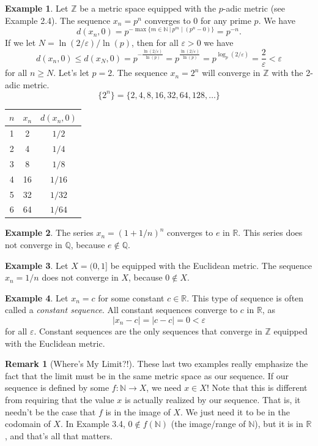 \documentclass{article}
\newcommand{\N}{\mathbb{N}}
\newcommand{\R}{\mathbb{R}}
\newcommand{\Q}{\mathbb{Q}}
\newcommand{\Z}{\mathbb{Z}}
\theoremstyle{definition}
\newtheorem{example}{Example}[section]
\newtheorem{remark}{Remark}[section]
\begin{document}
	\begin{example}
		Let $ \Z $ be a metric space equipped with the $ p $-adic metric (see Example 2.4). The sequence $ x_n=p^n $ converges to $ 0 $ for any prime $ p $. We have $$d(x_n,0)=p^{-\max\{ m\in\N\ |\ p^m\mid (p^n-0) \}}=p^{-n} .$$ If we let $ N=\ln(2/\varepsilon)/\ln(p) $, then for all $ \varepsilon>0 $ we have $$ d(x_n,0)\le d(x_N,0)=p^{-\frac{\ln(2/\varepsilon)}{\ln(p)}}=p^{\frac{\ln(2/\varepsilon)}{\ln(p)}}=p^{\log_p(2/\varepsilon)}=\frac{2}{\varepsilon}<\varepsilon$$ for all $ n\ge N $. Let's let $ p=2 $. The sequence $ x_n=2^n $ will converge in $ \Z $ with the 2-adic metric. $$ \{2^n\}=\{2,4,8,16,32,64,128,\ldots\}$$  
		\begin{center}
			\begin{tabular}{ccc}
				$ n $ & $ x_n $ & $ d(x_n,0) $ \\ \hline
				1 & 2     &  $ 1/2 $         \\
				2&   4   &   $ 1/4 $        \\
				3&    8  &   $ 1/8 $        \\
				4&     16 &   $ 1/16 $        \\
				5&      32&  $ 1/32 $          \\
				6&      64&       $ 1/64 $   
			\end{tabular}
		\end{center}
		
	\end{example}
	\begin{example}
		The series $ x_n=(1+1/n)^n $ converges to $ e $ in $ \R $. This series does not converge in $ \Q $, because $ e\notin\Q $. 
	\end{example}
	\begin{example}
		Let $ X=(0,1] $ be equipped with the Euclidean metric. The sequence $ x_n=1/n $ does not converge in $ X $, because $ 0\notin X $. 
	\end{example}
	\begin{example}
		Let $ x_n=c $ for some constant $ c\in\R $. This type of sequence is often called a \textit{\color{red}constant sequence}. All constant sequences converge to $ c $ in $ \R $, as $$ |x_n-c|=|c-c|=0<\varepsilon $$ for all $ \varepsilon $. Constant sequences are the only sequences that converge in $ \Z $ equipped with the Euclidean metric.
	\end{example}
	\begin{remark}[Where's My Limit?!]
		These last two examples really emphasize the fact that the limit must be in the same metric space as our sequence. If our sequence is defined by some $ f:\N\to X $, we need $ x\in X $! Note that this is different from requiring that the value $ x $ is actually realized by our sequence. That is, it needn't be the case that $ f $ is in the image of $ X $. We just need it to be in the codomain of $ X $. In Example 3.4, $ 0\notin f(\N) $ (the image/range of $ \N $), but it is in $ \R $, and that's all that matters. 
	\end{remark}
\end{document}

